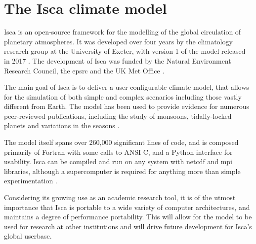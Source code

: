 \documentclass[a4paper,11pt]{report}
\begin{document}
\section{The Isca climate model}
Isca is an open-source framework for the modelling of the global circulation of planetary atmospheres. It was developed over four years by the climatology research group at the University of Exeter, with version 1 of the model released in 2017 \cite{vallis2018isca}. The development of Isca was funded by the Natural Environment Research Council, the \gls{epsrc} and the UK Met Office \cite{vallis2018isca}.
\par
The main goal of Isca is to deliver a user-configurable climate model, that allows for the simulation of both simple and complex scenarios including those vastly different from Earth. The model has been used to provide evidence for numerous peer-reviewed publications, including the study of monsoons, tidally-locked planets and variations in the seasons  \cite{penn2017thermal, thomson2018atmospheric, geen2018regime}.
 \par
 The model itself spans over 260,000 significant lines of code, and is composed primarily of Fortran with some calls to ANSI C, and a Python interface for usability. Isca can be compiled and run on any system with \gls{netcdf} and \gls{mpi} libraries, although a supercomputer is required for anything more than simple experimentation \cite{vallis2018isca}. 
 \par
Considering its growing use as an academic research tool, it is of the utmost importance that Isca is portable to a wide variety of computer architectures, and maintains a degree of performance portability. This will allow for the model to be used for research at other institutions and will drive future development for Isca's global userbase.
\end{document}
